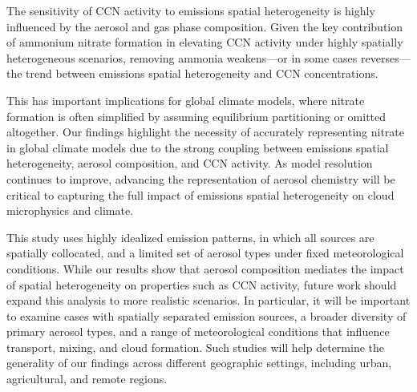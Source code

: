 \documentclass[journal abbreviation, manuscript]{copernicus}
\begin{document}
The sensitivity of CCN activity to emissions spatial heterogeneity is highly
influenced by the aerosol and gas phase composition. Given the key
contribution of ammonium nitrate formation in elevating CCN activity
under highly spatially heterogeneous scenarios, removing ammonia
weakens---or in some cases reverses---the trend between emissions
spatial heterogeneity and CCN concentrations.

This has important implications for global climate models, where 
nitrate formation is often simplified by assuming equilibrium partitioning 
or omitted altogether. Our findings highlight the necessity of accurately 
representing nitrate in global climate models due to the strong coupling 
between emissions spatial heterogeneity, aerosol composition, and 
CCN activity. As model resolution continues to improve, advancing the 
representation of aerosol chemistry will be critical to capturing the full impact of
emissions spatial heterogeneity on cloud microphysics and climate.

This study uses highly idealized emission patterns, in
which all sources are spatially collocated, and a limited set of
aerosol types under fixed meteorological conditions. While our results
show that aerosol composition mediates the impact of spatial
heterogeneity on properties such as CCN activity, future work should
expand this analysis to more realistic scenarios. In particular, it
will be important to examine cases with spatially separated emission
sources, a broader diversity of primary aerosol types, and a range of
meteorological conditions that influence transport, mixing, and cloud
formation. Such studies will help determine the generality of our
findings across different geographic settings, including urban,
agricultural, and remote regions.





\end{document}
